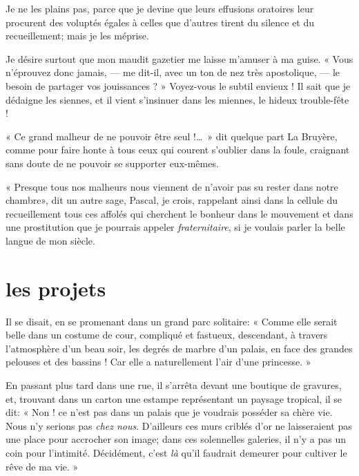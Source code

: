 Je ne les plains pas, parce que je devine que leurs effusions oratoires
leur procurent des voluptés égales à celles que
d’autres tirent du silence et du recueillement; mais
je les méprise.

Je désire surtout que mon maudit gazetier me laisse
m’amuser à ma guise. « Vous
n’éprouvez donc jamais, --- me dit{}-il, avec un ton de
nez très apostolique, --- le besoin de partager vos jouissances ? »
Voyez{}-vous le subtil envieux ! Il sait que je dédaigne les siennes,
et il vient s’insinuer dans les miennes, le hideux
trouble{}-fête !

« Ce grand malheur de ne pouvoir être seul !\ldots\ » dit quelque part La
Bruyère, comme pour faire honte à tous ceux qui courent
s’oublier dans la foule, craignant sans doute de ne
pouvoir se supporter eux{}-mêmes.

« Presque tous nos malheurs nous viennent de n’avoir
pas su rester dans notre chambre», dit un autre sage, Pascal, je crois,
rappelant ainsi dans la cellule du recueillement tous ces affolés qui
cherchent le bonheur dans le mouvement et dans une prostitution que je
pourrais appeler \textit{fraternitaire}, si je voulais parler la belle langue de
mon siècle.

\quebra\section[Les projets]{les projets}

Il se disait, en se promenant dans un grand parc solitaire: « Comme elle
serait belle dans un costume de cour, compliqué et fastueux,
descendant, à travers l’atmosphère
d’un beau soir, les degrés de marbre
d’un palais, en face des grandes pelouses et des
bassins ! Car elle a naturellement l’air
d’une princesse. »

En passant plus tard dans une rue, il s’arrêta devant
une boutique de gravures, et, trouvant dans un carton une estampe
représentant un paysage tropical, il se dit: « Non ! ce
n’est pas dans un palais que je voudrais posséder sa
chère vie. Nous n’y serions pas \textit{chez nous}.
D’ailleurs ces murs criblés d’or ne
laisseraient pas une place pour accrocher son image; dans ces
solennelles galeries, il n’y a pas un coin pour
l’intimité. Décidément, c’est \textit{là}
qu’il faudrait demeurer pour cultiver le rêve de ma
vie. »


